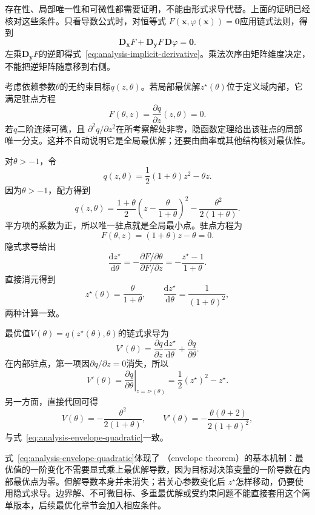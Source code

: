 存在性、局部唯一性和可微性都需要证明，不能由形式求导代替。上面的证明已经核对这些条件。只看导数公式时，对恒等式 $F(\bm{x},\varphi(\bm{x}))=\bm{0}$应用链式法则，得到
\[   \bm{D}_{\bm{x}}F   +   \bm{D}_{\bm{y}}F\,\bm{D}\varphi   =   \bm{0}. \]
左乘$\bm{D}_{\bm{y}}F$的逆即得式~\eqref{eq:analysis-implicit-derivative}。乘法次序由矩阵维度决定，不能把逆矩阵随意移到右侧。


考虑依赖参数$\theta$的无约束目标$q(z,\theta)$。若局部最优解$z^\star(\theta)$位于定义域内部，它满足驻点方程
\[   F(\theta,z)   =   \frac{\partial q}{\partial z}(z,\theta)   =   0. \]
若$q$二阶连续可微，且 $\partial^2q/\partial z^2$在所考察解处非零，隐函数定理给出该驻点的局部唯一分支。这并不自动说明它是全局最优解；还要由曲率或其他结构核对最优性。
\begin{example}[参数二次目标中的解导数与包络导数]
\label{ex:analysis-parametric-quadratic}
对$\theta>-1$，令
\[   q(z,\theta)   =   \frac12(1+\theta)z^2-\theta z. \]
因为$\theta>-1$，配方得到
\[
  q(z,\theta)=\frac{1+\theta}{2}
  \left(z-\frac{\theta}{1+\theta}\right)^2
  -\frac{\theta^2}{2(1+\theta)}.
\]
平方项的系数为正，所以唯一驻点就是全局最小点。驻点方程为
\[   F(\theta,z)=(1+\theta)z-\theta=0. \]
隐式求导给出
\[   \frac{\mathrm{d}z^\star}{\mathrm{d}\theta}   =   -\frac{\partial F/\partial\theta}{\partial F/\partial z}   =   -\frac{z^\star-1}{1+\theta}. \]
直接消元得到
\[   z^\star(\theta)=\frac{\theta}{1+\theta},   \qquad   \frac{\mathrm{d}z^\star}{\mathrm{d}\theta}   =   \frac{1}{(1+\theta)^2}, \]
两种计算一致。

最优值$V(\theta)=q(z^\star(\theta),\theta)$的链式求导为
\[   V'(\theta)   =   \frac{\partial q}{\partial z}   \frac{\mathrm{d}z^\star}{\mathrm{d}\theta}   +   \frac{\partial q}{\partial\theta}. \]
在内部驻点，第一项因$\partial q/\partial z=0$消失，所以
\begin{equation}
  V'(\theta)
  =
  \left.
  \frac{\partial q}{\partial\theta}
  \right|_{z=z^\star(\theta)}
  =
  \frac12(z^\star)^2-z^\star.
\label{eq:analysis-envelope-quadratic}
\end{equation}
另一方面，直接代回可得
\[   V(\theta)=-\frac{\theta^2}{2(1+\theta)},   \qquad   V'(\theta)   =   -\frac{\theta(\theta+2)}{2(1+\theta)^2}, \]
与式~\eqref{eq:analysis-envelope-quadratic}一致。
\end{example}

式~\eqref{eq:analysis-envelope-quadratic}体现了
（envelope theorem）的基本机制：最优值的一阶变化不需要显式乘上最优解导数，因为目标对决策变量的一阶导数在内部最优点为零。但解导数本身并未消失；若关心参数变化后 $z^\star$怎样移动，仍要使用隐式求导。边界解、不可微目标、多重最优解或受约束问题不能直接套用这个简单版本，后续最优化章节会加入相应条件。

